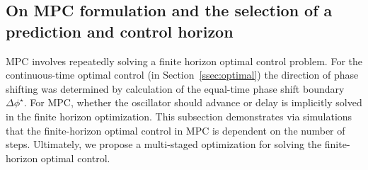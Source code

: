 \subsection*{On MPC formulation and the selection of a prediction and control horizon}



MPC involves repeatedly solving a finite horizon optimal control problem.
For the continuous-time optimal control (in Section~\ref{ssec:optimal}) the direction of phase shifting was determined by calculation of the equal-time phase shift boundary $\Delta\phi^\star$.
For MPC, whether the oscillator should advance or delay is implicitly solved in the finite horizon optimization.
This subsection demonstrates via simulations that the finite-horizon optimal control in MPC is dependent on the number of steps.
Ultimately, we propose a multi-staged optimization for solving the finite-horizon optimal control.

